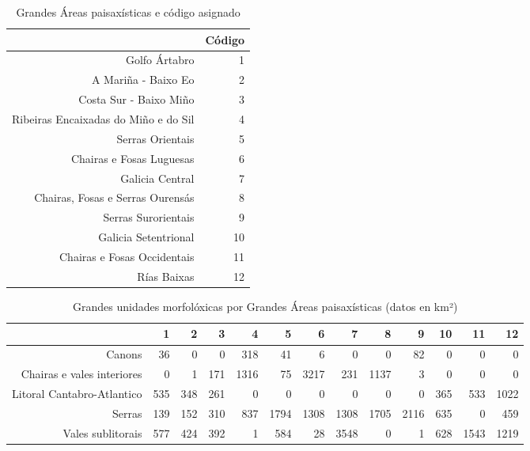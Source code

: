 \begin{table}[p]
\centering
\caption{Grandes Áreas paisaxísticas e código asignado} 
\label{xtaboa0}
\begin{tabular}{rr}
  \hline
 & Código \\ 
  \hline
Golfo Ártabro &   1 \\ 
  A Mariña - Baixo Eo &   2 \\ 
  Costa Sur - Baixo Miño &   3 \\ 
  Ribeiras Encaixadas do Miño e do Sil &   4 \\ 
  Serras Orientais &   5 \\ 
  Chairas e Fosas Luguesas &   6 \\ 
  Galicia Central &   7 \\ 
  Chairas, Fosas e Serras Ourensás &   8 \\ 
  Serras Surorientais &   9 \\ 
  Galicia Setentrional &  10 \\ 
  Chairas e Fosas Occidentais &  11 \\ 
  Rías Baixas &  12 \\ 
   \hline
\end{tabular}
\end{table}
\begin{table}[p]
\centering
\caption{Grandes unidades morfolóxicas por Grandes Áreas paisaxísticas (datos en km²)} 
\label{xtaboa1}
\begin{tabular}{rrrrrrrrrrrrr}
  \hline
 & 1 & 2 & 3 & 4 & 5 & 6 & 7 & 8 & 9 & 10 & 11 & 12 \\ 
  \hline
Canons & 36 & 0 & 0 & 318 & 41 & 6 & 0 & 0 & 82 & 0 & 0 & 0 \\ 
  Chairas e vales interiores & 0 & 1 & 171 & 1316 & 75 & 3217 & 231 & 1137 & 3 & 0 & 0 & 0 \\ 
  Litoral Cantabro-Atlantico & 535 & 348 & 261 & 0 & 0 & 0 & 0 & 0 & 0 & 365 & 533 & 1022 \\ 
  Serras & 139 & 152 & 310 & 837 & 1794 & 1308 & 1308 & 1705 & 2116 & 635 & 0 & 459 \\ 
  Vales sublitorais & 577 & 424 & 392 & 1 & 584 & 28 & 3548 & 0 & 1 & 628 & 1543 & 1219 \\ 
   \hline
\end{tabular}
\end{table}
